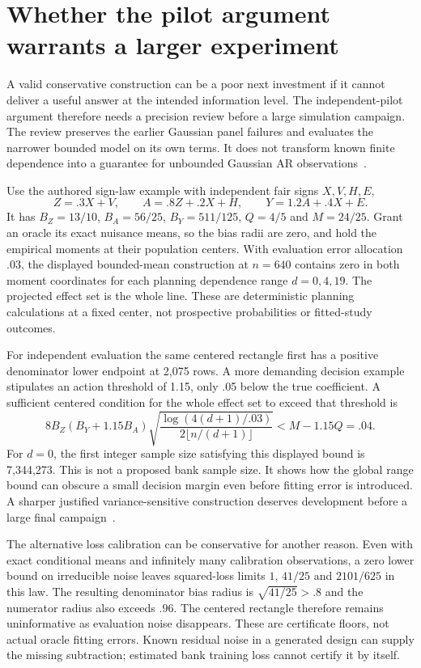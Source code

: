 \section{Whether the pilot argument warrants a larger experiment}
\label{exec13:dependent-design-review}

A valid conservative construction can be a poor next investment if it
cannot deliver a useful answer at the intended information level. The
independent-pilot argument therefore needs a precision review before a
large simulation campaign. The review preserves the earlier Gaussian
panel failures and evaluates the narrower bounded model on its own
terms. It does not transform known finite dependence into a guarantee
for unbounded Gaussian AR observations~\citep{exec13_ivrd_dependent}.

Use the authored sign-law example with independent fair signs
$X,V,H,E$,
\[
 Z=.3X+V,\qquad A=.8Z+.2X+H,\qquad Y=1.2A+.4X+E.
\]
It has $B_Z=13/10$, $B_A=56/25$, $B_Y=511/125$, $Q=4/5$ and
$M=24/25$. Grant an oracle its exact nuisance means, so the bias
radii are zero, and hold the empirical moments at their population
centers. With evaluation error allocation $.03$, the displayed
bounded-mean construction at $n=640$ contains zero in both moment
coordinates for each planning dependence range $d=0,4,19$.
The projected effect set is the whole line. These are deterministic
planning calculations at a fixed center, not prospective probabilities
or fitted-study outcomes.

For independent evaluation the same centered rectangle first has
a positive denominator lower endpoint at 2,075 rows. A more demanding
decision example stipulates an action threshold of 1.15, only .05
below the true coefficient. A sufficient centered condition for
the whole effect set to exceed that threshold is
\[
 8B_Z(B_Y+1.15B_A)
 \sqrt{\frac{\log(4(d+1)/.03)}{2\lfloor n/(d+1)\rfloor}}
 <M-1.15Q=.04.
\]
For $d=0$, the first integer sample size satisfying this displayed
bound is 7,344,273. This is not a proposed bank sample size. It
shows how the global range bound can obscure a small decision
margin even before fitting error is introduced. A sharper justified
variance-sensitive construction deserves development before a large
final campaign~\citep{exec13_ivrd_dependent}.

The alternative loss calibration can be conservative for another
reason. Even with exact conditional means and infinitely many
calibration observations, a zero lower bound on irreducible noise
leaves squared-loss limits $1$, $41/25$ and $2101/625$ in this law.
The resulting denominator bias radius is $\sqrt{41/25}>.8$ and
the numerator radius also exceeds $.96$. The centered rectangle
therefore remains uninformative as evaluation noise disappears.
These are certificate floors, not actual oracle fitting errors.
Known residual noise in a generated design can supply the missing
subtraction; estimated bank training loss cannot certify it by itself.

